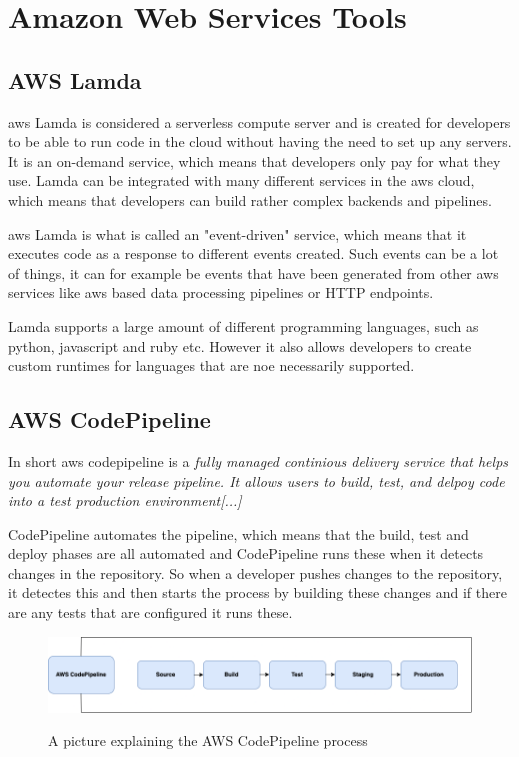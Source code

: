 \section{Amazon Web Services Tools}
\subsection{AWS Lamda}
\acrshort{aws} Lamda is considered a serverless compute server and is created for developers to be able to run code in the cloud without having the need to set up any servers. It is an on-demand service, which means that developers only pay for what they use. Lamda can be integrated with many different services in the \acrshort{aws} cloud, which means that developers can build rather complex backends and pipelines. 

\acrshort{aws} Lamda is what is called an "event-driven" service, which means that it executes code as a response to different events created. Such events can be a lot of things, it can for example be events that have been generated from other \acrshort{aws} services like \acrshort{aws} based data processing pipelines or HTTP endpoints. 

Lamda supports a large amount of different programming languages, such as python, javascript and ruby etc. However it also allows developers to create custom runtimes for languages that are noe necessarily supported. \cite{AWSLamda}



\subsection{AWS CodePipeline}
In short \acrshort{aws} codepipeline is a \textit{fully managed continious delivery service that helps you automate your release pipeline. It allows users to build, test, and delpoy code into a test production environment[...]}
\cite{AWSCodePipeline}

CodePipeline automates the pipeline, which means that the build, test and deploy phases are all automated and CodePipeline runs these when it detects changes in the repository. So when a developer pushes changes to the repository, it detectes this and then starts the process by building these changes and if there are any tests that are configured it runs these. \cite{AWSCodePipeline1}
\begin{figure}[htp]
    \centering
    \includegraphics[width=1\columnwidth]{Images/CodePipeline.png}
    \caption{A picture explaining the AWS CodePipeline process}\cite{AWSCodePipeline2}
    \label{fig:my_label}
\end{figure}

